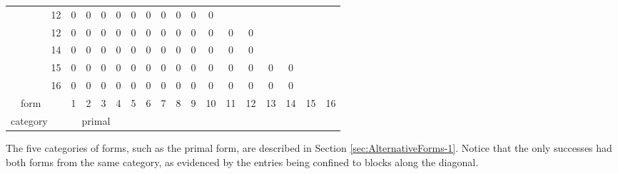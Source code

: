 \documentclass[12pt,english]{article}
\providecommand{\tabularnewline}{\\}
\theoremstyle{definition}
\theoremstyle{remark}
\theoremstyle{plain}
\theoremstyle{plain}
\begin{document}
\begin{table}[H]
\begin{tabular}{|c|c|c|cccc|cccccccccccc}
 & \rule[-9pt]{0pt}{26pt} & 12 & 0 & 0 & 0 & 0 & 0 & 0 & 0 & 0 & 0 & \multicolumn{1}{c|}{0} & \textbf{} & \textbf{} &  &  &  & \tabularnewline
\cline{1-15} 
\multirow{2}{*}{\begin{sideways}
\textsl{\scriptsize \negthinspace{}\negthinspace{}\negthinspace{}\negthinspace{}\negthinspace{}\negthinspace{}\negthinspace{}\negthinspace{}\negthinspace{}\negthinspace{}}
\end{sideways}} & \rule[-9pt]{0pt}{26pt} & 12 & 0 & 0 & 0 & 0 & 0 & 0 & 0 & 0 & 0 & \multicolumn{1}{c|}{0} & 0 & \multicolumn{1}{c|}{0} & \textbf{} &  &  & \tabularnewline
\cline{2-3} 
 & \rule[-9pt]{0pt}{26pt} & 14 & 0 & 0 & 0 & 0 & 0 & 0 & 0 & 0 & 0 & \multicolumn{1}{c|}{0} & 0 & \multicolumn{1}{c|}{0} & \textbf{} & \textbf{} &  & \tabularnewline
\cline{1-17} 
\multirow{2}{*}{\begin{sideways}
\textsl{\scriptsize \negthinspace{}\negthinspace{}\negthinspace{}\negthinspace{}}
\end{sideways}} & \rule[-9pt]{0pt}{26pt} & 15 & 0 & 0 & 0 & 0 & 0 & 0 & 0 & 0 & 0 & \multicolumn{1}{c|}{0} & 0 & \multicolumn{1}{c|}{0} & 0 & \multicolumn{1}{c|}{0} & \textbf{} & \tabularnewline
\cline{2-3} 
 & \rule[-9pt]{0pt}{26pt} & 16 & 0 & 0 & 0 & 0 & 0 & 0 & 0 & 0 & 0 & \multicolumn{1}{c|}{0} & 0 & \multicolumn{1}{c|}{0} & 0 & \multicolumn{1}{c|}{0} &  & \textbf{}\tabularnewline
\hline 
\hline 
 & form & \textbf{\scriptsize } & \multicolumn{1}{c|}{1} & \multicolumn{1}{c|}{2} & \multicolumn{1}{c|}{3} & 4 & \multicolumn{1}{c|}{5} & \multicolumn{1}{c|}{6} & \multicolumn{1}{c|}{7} & \multicolumn{1}{c|}{8} & \multicolumn{1}{c|}{9} & \multicolumn{1}{c|}{10} & \multicolumn{1}{c|}{11} & \multicolumn{1}{c|}{12} & \multicolumn{1}{c|}{13} & \multicolumn{1}{c|}{14} & \multicolumn{1}{c|}{15} & \multicolumn{1}{c|}{16}\tabularnewline
\hline 
\multicolumn{3}{|l|}{ category } & \multicolumn{4}{c|}{primal} & \multicolumn{6}{c|}{\textsl{\scriptsize }} & \multicolumn{2}{c|}{\textsl{\scriptsize \negthinspace{}\negthinspace{}\negthinspace{}\negthinspace{}\negthinspace{}\negthinspace{}\negthinspace{}\negthinspace{}}} & \multicolumn{2}{c|}{\textsl{\scriptsize \negthinspace{}\negthinspace{}\negthinspace{}\negthinspace{}\negthinspace{}\negthinspace{}\negthinspace{}\negthinspace{}\negthinspace{}\negthinspace{}}} & \multicolumn{2}{c|}{\textsl{\scriptsize \negthinspace{}\negthinspace{}\negthinspace{}\negthinspace{}}}\tabularnewline
\hline 
\end{tabular}
\end{table}


The five categories of forms, such as the primal form, are described
in Section \ref{sec:AlternativeForms-1}. Notice that the only successes
had both forms from the same category, as evidenced by the 
entries being confined to blocks along the diagonal.
\end{document}
